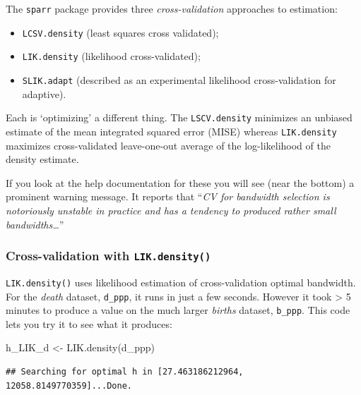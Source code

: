 \documentclass[
]{book}
\newenvironment{Shaded}{\begin{snugshade}}{\end{snugshade}}
\newcommand{\FunctionTok}[1]{\textcolor[rgb]{0.00,0.00,0.00}{#1}}
\newcommand{\NormalTok}[1]{#1}
\newcommand{\OtherTok}[1]{\textcolor[rgb]{0.56,0.35,0.01}{#1}}
\providecommand{\tightlist}{%
  \setlength{\itemsep}{0pt}\setlength{\parskip}{0pt}}
\newenvironment{rmdnote}[1]
  {
  \begin{itemize}
  \renewcommand{\labelitemi}{
    \raisebox{-.7\height}[0pt][0pt]{
      {\setkeys{Gin}{width=3em,keepaspectratio}\texttt{[image: images/\#1]}}
    }
  }
  \setlength{\fboxsep}{1em}
  \begin{note}
  \item
  }
  {
  \end{note}
  \end{itemize}
  }
\begin{document}
\begin{rmdnote}{note}
The \texttt{sparr} package provides three \emph{cross-validation} approaches to estimation:

\begin{itemize}
\tightlist
\item
  \texttt{LCSV.density} (least squares cross validated);
\item
  \texttt{LIK.density} (likelihood cross-validated);
\item
  \texttt{SLIK.adapt} (described as an experimental likelihood cross-validation for adaptive).
\end{itemize}

Each is `optimizing' a different thing. The \texttt{LSCV.density} minimizes an unbiased estimate of the mean integrated squared error (MISE) whereas \texttt{LIK.density} maximizes cross-validated leave-one-out average of the log-likelihood of the density estimate.

If you look at the help documentation for these you will see (near the bottom) a prominent warning message. It reports that ``\emph{CV for bandwidth selection is notoriously unstable in practice and has a tendency to produced rather small bandwidths\ldots{}}''

\end{rmdnote}

\hypertarget{cross-validation-with-lik.density}{%
\subsubsection{\texorpdfstring{Cross-validation with \texttt{LIK.density()}}{Cross-validation with LIK.density()}}\label{cross-validation-with-lik.density}}

\texttt{LIK.density()} uses likelihood estimation of cross-validation optimal bandwidth. For the \emph{death} dataset, \texttt{d\_ppp}, it runs in just a few seconds. However it took \textgreater{} 5 minutes to produce a value on the much larger \emph{births} dataset, \texttt{b\_ppp}. This code lets you try it to see what it produces:

\begin{Shaded}
\begin{Highlighting}[]
\NormalTok{h\_LIK\_d }\OtherTok{\textless{}{-}} \FunctionTok{LIK.density}\NormalTok{(d\_ppp)}
\end{Highlighting}
\end{Shaded}

\begin{verbatim}
## Searching for optimal h in [27.463186212964, 12058.8149770359]...Done.
\end{verbatim}
\end{document}
